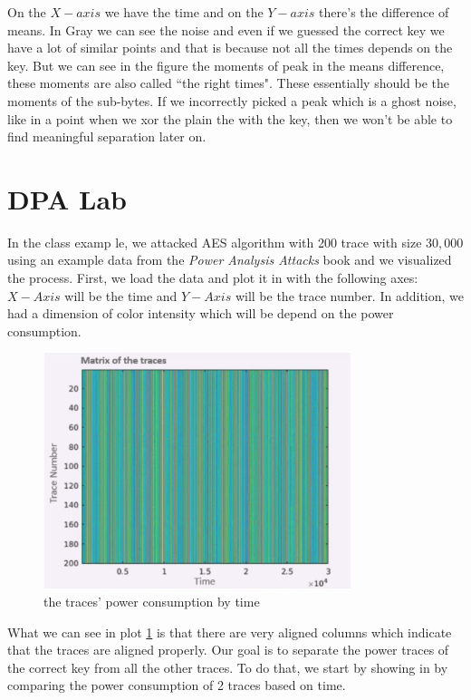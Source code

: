 On the $X-axis$ we have the time and on the $Y-axis$ there's the difference of
means. In Gray we can see the noise and even if we guessed the correct key we
have a lot of similar points and that is because not all the times depends on
the key. But we can see in the figure the moments of peak in the means
difference, these moments are also called ``the right times". These essentially
should be the moments of the sub-bytes. If we incorrectly picked a peak which is
a ghost noise, like in a point when we xor the plain the with the key, then we
won't be able to find meaningful separation later on.

\section{DPA Lab}
In the class examp le, we attacked AES algorithm with 200 trace with size
$30,000$ using an example data from the \textit{Power Analysis Attacks} book and
we visualized the process. First, we load the data and plot it in
 with the following axes: $X-Axis$ will be the time and
$Y-Axis$ will be the trace number. In addition, we had a dimension of color
intensity which will be depend on the power consumption.

\begin{figure}[!ht]
    \centering
    \includegraphics[width=0.8\textwidth]{images/Lecture6/traceByTime.png}
    \caption{the traces' power consumption by time} \label{fig:traceByTime}
\end{figure}

What we can see in plot \ref{fig:traceByTime} is that there are very aligned
columns which indicate that the traces are aligned properly. Our goal is to
separate the power traces of the correct key from all the other traces. To do
that, we start by showing in  by comparing the power
consumption of 2 traces based on time.

